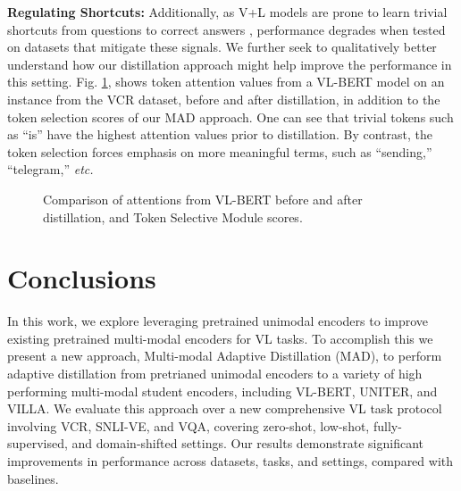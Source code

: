 \documentclass[runningheads]{llncs}
\begin{document}
\noindent\textbf{Regulating Shortcuts: }Additionally, as V+L models are prone to learn trivial shortcuts from questions to correct answers \cite{kovaleva2019revealing,debias}, performance degrades when tested on datasets that mitigate these signals. We further seek to qualitatively better understand how our distillation approach might help improve the performance in this setting. Fig. \ref{fig:sample_example}, shows token attention values from a VL-BERT model on an instance from the VCR dataset, before and after distillation, in addition to the token selection scores of our MAD approach. One can see that trivial tokens such as ``is'' have the highest attention values prior to distillation. By contrast, the token selection forces emphasis on more meaningful terms, such as ``sending,'' ``telegram,'' \textit{etc.}


\begin{figure}[htpb!]
\begin{center}
\scriptsize
{}
\end{center}
\caption{Comparison of attentions from VL-BERT before and after distillation, and Token Selective Module scores.}
\label{fig:sample_example}
\end{figure}



\section{Conclusions}


In this work, we explore leveraging pretrained unimodal encoders to improve existing pretrained multi-modal encoders for VL tasks. To accomplish this we present a new approach, Multi-modal Adaptive Distillation (MAD), to perform adaptive distillation from pretrianed unimodal encoders to a variety of high performing multi-modal student encoders, including VL-BERT, UNITER, and VILLA. We evaluate this approach over a new comprehensive VL task protocol involving VCR, SNLI-VE, and VQA, covering zero-shot, low-shot, fully-supervised, and domain-shifted settings. Our results demonstrate significant improvements in performance across datasets, tasks, and settings, compared with baselines.
\end{document}
